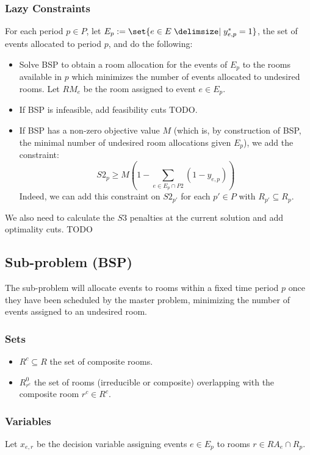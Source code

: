 \documentclass{article}
\theoremstyle{plain}
\numberwithin{theorem}{section}
\numberwithin{example}{section}
\theoremstyle{definition}
\begin{document}
\subsubsection*{Lazy Constraints}
For each period $p \in P$, let $E_p := \set{e \in E \given y^*_{e, p} = 1}$, the
set of events allocated to period $p$, and do the following:
\begin{itemize}
    \item Solve BSP to obtain a room allocation for the events of $E_p$ to the
        rooms available in $p$ which minimizes the number of events allocated to
        undesired rooms. Let $RM_e$ be the room assigned to event $e \in E_p$.
    \item If BSP is infeasible, add feasibility cuts TODO.
    \item If BSP has a non-zero objective value $M$ (which is, by construction
        of BSP, the minimal number of undesired room allocations given $E_p$),
        we add the constraint:
        \begin{equation}
            S2_p \geq M \left(1 - \sum_{e \in E_p \cap P2} (1 - y_{e, p})\right)
        \end{equation}
        Indeed, we can add this constraint on $S2_{p'}$ for each $p' \in P$ with
        $R_{p'} \subseteq R_p$.
\end{itemize}
We also need to calculate the $S3$ penalties at the current solution and add
optimality cuts. TODO

\subsection{Sub-problem (BSP)} \label{BSP}
The sub-problem will allocate events to rooms within a fixed time period $p$
once they have been scheduled by the master problem, minimizing the number of
events assigned to an undesired room.

\subsubsection*{Sets}
\begin{itemize}
    \item $R^c \subseteq R$ the set of composite rooms.
    \item $R^0_{r^c}$ the set of rooms (irreducible or composite) overlapping
        with the composite room $r^c \in R^c$.
\end{itemize}

\subsubsection*{Variables}
Let $x_{e,r}$ be the decision variable assigning events $e \in E_p$ to rooms $r
\in RA_e \cap R_p$.
\end{document}
